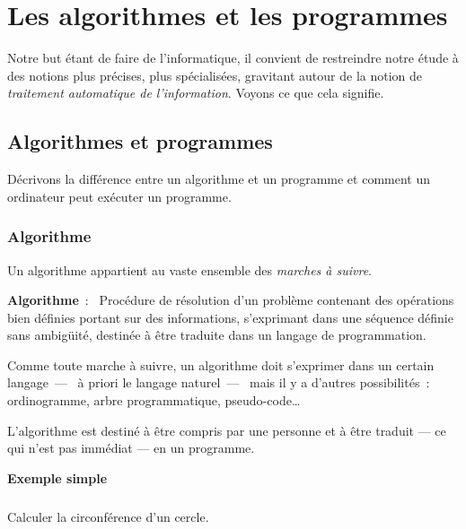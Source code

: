 \chapter{Les algorithmes et les programmes}
\label{algoprog}

	Notre but étant de faire de l’informatique, 
	il convient de restreindre notre étude 
	à des notions plus précises, plus spécialisées, 
	gravitant autour de la notion de 
	\textit{traitement automatique de l’information}.
	Voyons ce que cela signifie.

	\minitoc

	\section{Algorithmes et programmes}
	
		Décrivons la différence entre un algorithme et un programme
		et comment un ordinateur peut exécuter un programme.
	
		\subsection{Algorithme}
		
			Un algorithme appartient au vaste ensemble 
			des \textit{marches à suivre}.
	
			\textbf{Algorithme}~:~
			Procédure de résolution d’un problème 
			contenant des opérations bien définies 
			portant sur des informations, 
			s’exprimant dans une séquence définie sans ambigüité, 
			destinée à être traduite dans un langage de programmation.
		
			Comme toute marche à suivre, un algorithme doit s’exprimer dans un
			certain langage~—~ à priori le langage naturel~—~ mais il
			y a d’autres possibilités~:~ ordinogramme, arbre programmatique,
			pseudo-code…

			L'algorithme est destiné à être compris par une personne et à être
			traduit — ce qui n'est pas immédiat — en un programme. 

			\textbf{Exemple simple}

			\begin{Emphase}
				\paragraph{} Calculer la circonférence d'un cercle.
			\end{Emphase}

